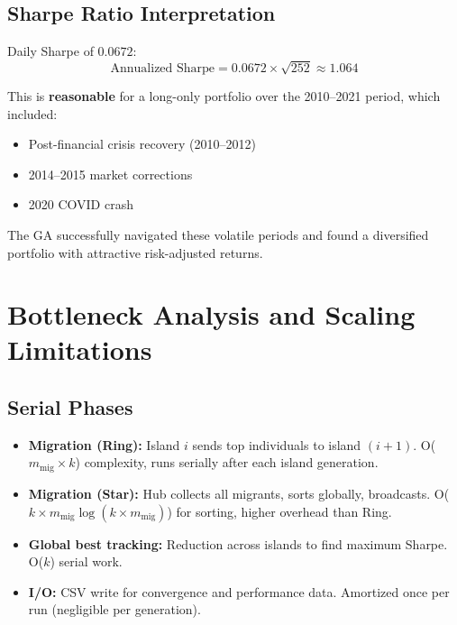 \documentclass[12pt,a4paper]{article}
\begin{document}
\subsection{Sharpe Ratio Interpretation}

Daily Sharpe of $0.0672$:
\begin{equation}
\text{Annualized Sharpe} = 0.0672 \times \sqrt{252} \approx 1.064
\label{eq:annual_sharpe}
\end{equation}

This is \textbf{reasonable} for a long-only portfolio over the 2010--2021 period, which included:
\begin{itemize}
	\item Post-financial crisis recovery (2010--2012)
	\item 2014--2015 market corrections
	\item 2020 COVID crash
\end{itemize}

The GA successfully navigated these volatile periods and found a diversified portfolio with attractive risk-adjusted returns.

\newpage
\section{Bottleneck Analysis and Scaling Limitations}

\subsection{Serial Phases}

\begin{itemize}
	\item \textbf{Migration (Ring):} Island $i$ sends top individuals to island $(i+1)$. O($m_{\text{mig}} \times k$) complexity, runs serially after each island generation.
	
	\item \textbf{Migration (Star):} Hub collects all migrants, sorts globally, broadcasts. O($k \times m_{\text{mig}} \log(k \times m_{\text{mig}})$) for sorting, higher overhead than Ring.
	
	\item \textbf{Global best tracking:} Reduction across islands to find maximum Sharpe. O($k$) serial work.
	
	\item \textbf{I/O:} CSV write for convergence and performance data. Amortized once per run (negligible per generation).
\end{itemize}
\end{document}

